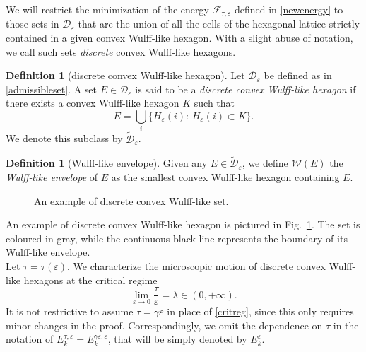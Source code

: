 \documentclass{interact}
\numberwithin{equation}{section}
\theoremstyle{definition}
\newtheorem{defn}[thm]{Definition}
\renewcommand{\epsilon}{\varepsilon}
\begin{document}
{We will restrict the minimization of the energy $\mathcal{F}_{\tau,\varepsilon}$ defined in \eqref{newenergy} to those sets in $\mathcal{D}_\epsilon$ that are the union of all the cells of the hexagonal lattice strictly contained in a given convex Wulff-like hexagon. With a slight abuse of notation, we call such sets \emph{discrete} convex Wulff-like hexagons.}

{\begin{defn}[discrete convex Wulff-like hexagon]\label{dcwsl}
Let $\mathcal{D}_\varepsilon$ be defined as in \eqref{admissibleset}. A set $E\in\mathcal{D}_\epsilon$ is said to be a \emph{discrete convex Wulff-like hexagon} if there exists a convex Wulff-like hexagon $K$ such that
\begin{equation}
E=\bigcup_i\bigl\{H_\epsilon(i):\, H_\epsilon(i)\subset K\bigr\}.
\end{equation}
We denote this subclass by $\widetilde{\mathcal{D}}_\epsilon$.
\end{defn}}

{\begin{defn}[Wulff-like envelope]
Given any $E\in\widetilde{\mathcal{D}}_\epsilon$, we define $\mathcal{W}(E)$ the \emph{Wulff-like envelope} of $E$ as the smallest convex Wulff-like hexagon containing $E$. 
\end{defn}}

\begin{figure}[htbp]
\centering
\def\svgwidth{150pt}

\caption{An example of discrete convex Wulff-like set.}\label{fig:discrete}
\end{figure}

An example of discrete convex Wulff-like hexagon is pictured in Fig.~\ref{fig:discrete}. The set is coloured in gray, while the continuous black line represents the boundary of its Wulff-like envelope.\\ %

Let $\tau=\tau(\epsilon)$. We characterize the microscopic motion of discrete convex Wulff-like hexagons at the critical regime
\begin{equation}
\lim_{\varepsilon\to0}\frac{\tau}{\varepsilon}=\lambda\in(0,+\infty).
\label{critreg}
\end{equation}
It is not restrictive to assume $\tau=\gamma\epsilon$ in place of \eqref{critreg}, since this only requires minor changes in the proof. Correspondingly, we omit the dependence on $\tau$ in the notation of $E_k^{\tau,\epsilon}=E_k^{\gamma\epsilon,\epsilon}$, that will be simply denoted by $E_k^\epsilon$.
\end{document}

